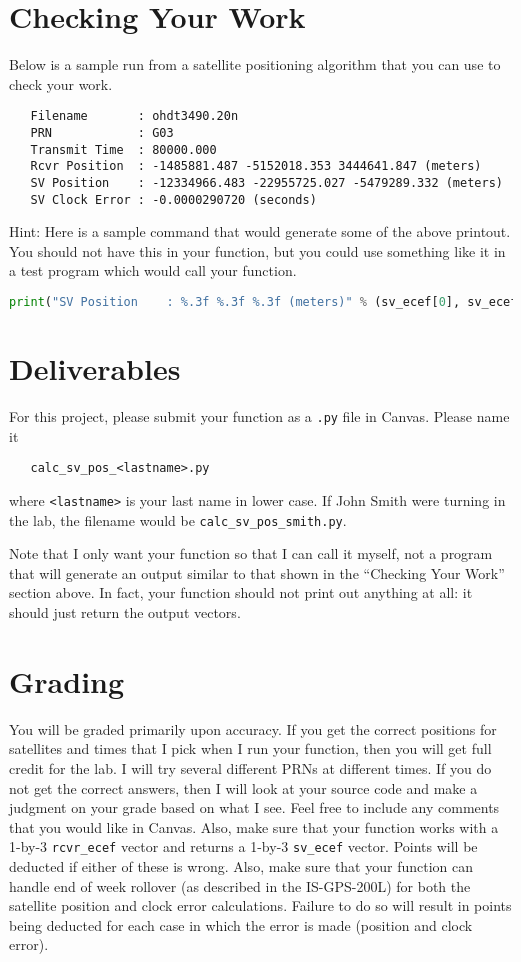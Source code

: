 \documentclass[12pt]{article}
\begin{document}
\section*{\textsf{Checking Your Work}}

Below is a sample run from a satellite positioning algorithm that you can use to
check your work.

\begin{verbatim}
   Filename       : ohdt3490.20n
   PRN            : G03
   Transmit Time  : 80000.000
   Rcvr Position  : -1485881.487 -5152018.353 3444641.847 (meters)
   SV Position    : -12334966.483 -22955725.027 -5479289.332 (meters)
   SV Clock Error : -0.0000290720 (seconds)
\end{verbatim}

Hint: Here is a sample command that would generate some of the above printout.
You should not have this in your function, but you could use something like it
in a test program which would call your function.
\begin{lstlisting}[language = Python]
    print("SV Position    : %.3f %.3f %.3f (meters)" % (sv_ecef[0], sv_ecef[1], sv_ecef[2]))
\end{lstlisting}

\section*{\textsf{Deliverables}}

For this project, please submit your function as a \texttt{.py} file in Canvas.
Please name it
\begin{verbatim}
   calc_sv_pos_<lastname>.py
\end{verbatim}
where \texttt{<lastname>} is your last name in lower case.  If John Smith were
turning in the lab, the filename would be \texttt{calc\_sv\_pos\_smith.py}.

Note that I only want your function so that I can call it myself, not a program
that will generate an output similar to that shown in the ``Checking Your Work''
section above.  In fact, your function should not print out anything at all: it
should just return the output vectors.

\section*{\textsf{Grading}}

You will be graded primarily upon accuracy.  If you get the correct positions
for satellites and times that I pick when I run your function, then you will get
full credit for the lab.  I will try several different PRNs at different times.
If you do not get the correct answers, then I will look at your source code and
make a judgment on your grade based on what I see.  Feel free to include any
comments that you would like in Canvas.  Also, make sure that your function
works with a 1-by-3 \texttt{rcvr\_ecef} vector and returns a 1-by-3
\texttt{sv\_ecef} vector.  Points will be deducted if either of these is wrong.
Also, make sure that your function can handle end of week rollover (as described
in the IS-GPS-200L) for both the satellite position and clock error
calculations.  Failure to do so will result in points being deducted for each
case in which the error is made (position and clock error).
\end{document}
